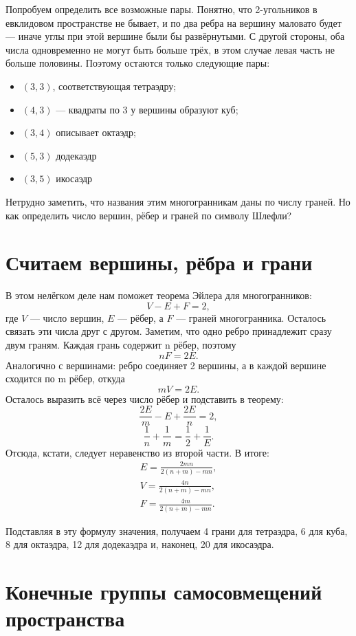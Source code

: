 Попробуем определить все возможные пары. Понятно, что 2-угольников в евклидовом пространстве не бывает, и по два ребра на вершину маловато будет --- иначе углы при этой вершине были бы развёрнутыми. С другой стороны, оба числа одновременно не могут быть больше трёх, в этом случае левая часть не больше половины. Поэтому остаются только следующие пары:
\begin{itemize}
  \item \( (3,3) \), соответствующая тетраэдру;
  \item \( (4,3) \) --- квадраты по 3 у вершины образуют куб;
  \item \( (3,4) \) описывает октаэдр;
  \item \( (5,3) \) додекаэдр
  \item \( (3,5) \) икосаэдр
\end{itemize}

Нетрудно заметить, что названия этим многогранникам даны по числу граней. Но как определить число вершин, рёбер и граней по символу Шлефли?

\section{Считаем вершины, рёбра и грани}

В этом нелёгком деле нам поможет теорема Эйлера для многогранников:
\[
    V - E + F = 2,
\]
где \(V\) --- число вершин, \(E\) --- рёбер, а \(F\) --- граней многогранника. Осталось связать эти числа друг с другом.
Заметим, что одно ребро принадлежит сразу двум граням. Каждая грань содержит n рёбер, поэтому
\[
    nF = 2E.
\]
Аналогично с вершинами: ребро соединяет 2 вершины, а в каждой вершине сходится по m рёбер, откуда
\[
    mV = 2E.
\]
Осталось выразить всё через число рёбер и подставить в теорему:
\[
    \frac{2E}{m} - E + \frac{2E}{n} = 2,
\]
\[
    \frac{1}{n} + \frac{1}{m} = \frac{1}{2} + \frac{1}{E}.
\]
Отсюда, кстати, следует неравенство из второй части. В итоге:
\[
\begin{array}{l}
    E = \frac{2mn}{2(n + m) - mn},\\
    V = \frac{4n}{2(n + m) - mn},\\
    F = \frac{4m}{2(n + m) - mn}.
\end{array}
\]

Подставляя в эту формулу значения, получаем 4 грани для тетраэдра, 6 для куба, 8 для октаэдра, 12 для додекаэдра и, наконец, 20 для икосаэдра.

\section{Конечные группы самосовмещений пространства}

